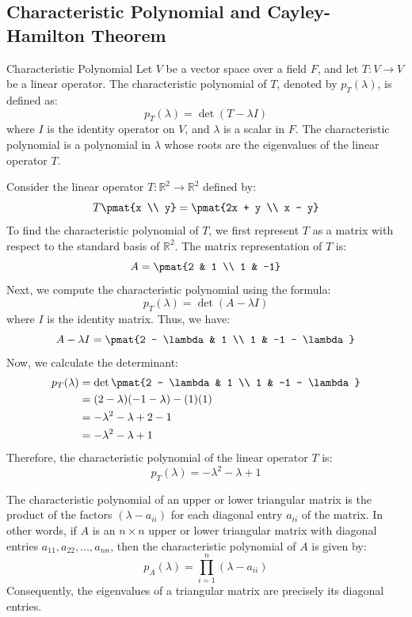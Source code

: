 \documentclass[openany]{book}
\begin{document}
\subsection{Characteristic Polynomial and Cayley-Hamilton Theorem}
\begin{mydefinition}{Characteristic Polynomial}
    Let $V$ be a vector space over a field $F$, and let $T: V \to V$ be a linear operator. The characteristic polynomial of $T$, denoted by $p_T(\lambda)$, is defined as:
    $$p_T(\lambda) = \det(T - \lambda I)$$
    where $I$ is the identity operator on $V$, and $\lambda$ is a scalar in $F$. The characteristic polynomial is a polynomial in $\lambda$ whose roots are the eigenvalues of the linear operator $T$.
\end{mydefinition}
\begin{example}
    Consider the linear operator $T: \mathbb{R}^2 \to \mathbb{R}^2$ defined by:
    $$T\pmat{x \\ y} = \pmat{2x + y \\ x - y}$$
    To find the characteristic polynomial of $T$, we first represent $T$ as a matrix with respect to the standard basis of $\mathbb{R}^2$. The matrix representation of $T$ is:
    $$A = \pmat{2 & 1 \\ 1 & -1}$$
    Next, we compute the characteristic polynomial using the formula:
    $$p_T(\lambda) = \det(A - \lambda I)$$
    where $I$ is the identity matrix. Thus, we have:
    $$A - \lambda I = \pmat{2 - \lambda & 1 \\ 1 & -1 - \lambda}$$
    Now, we calculate the determinant:
    \[
    \begin{aligned}
    p_T(\lambda) &= \det\pmat{2 - \lambda & 1 \\ 1 & -1 - \lambda} \\
    &= (2 - \lambda)(-1 - \lambda) - (1)(1) \\
    &= -\lambda^2 - \lambda + 2 - 1 \\
    &= -\lambda^2 - \lambda + 1
    \end{aligned}
    \]
    Therefore, the characteristic polynomial of the linear operator $T$ is:
    $$p_T(\lambda) = -\lambda^2 - \lambda + 1$$
\end{example}
\begin{mytheorem}
    The characteristic polynomial of an upper or lower triangular matrix is the product of the factors $(\lambda - a_{ii})$ for each diagonal entry $a_{ii}$ of the matrix. In other words, if $A$ is an $n \times n$ upper or lower triangular matrix with diagonal entries $a_{11}, a_{22}, \ldots, a_{nn}$, then the characteristic polynomial of $A$ is given by:
    $$p_A(\lambda) = \prod_{i=1}^{n} (\lambda - a_{ii})$$
    Consequently, the eigenvalues of a triangular matrix are precisely its diagonal entries.
\end{mytheorem}
\end{document}
